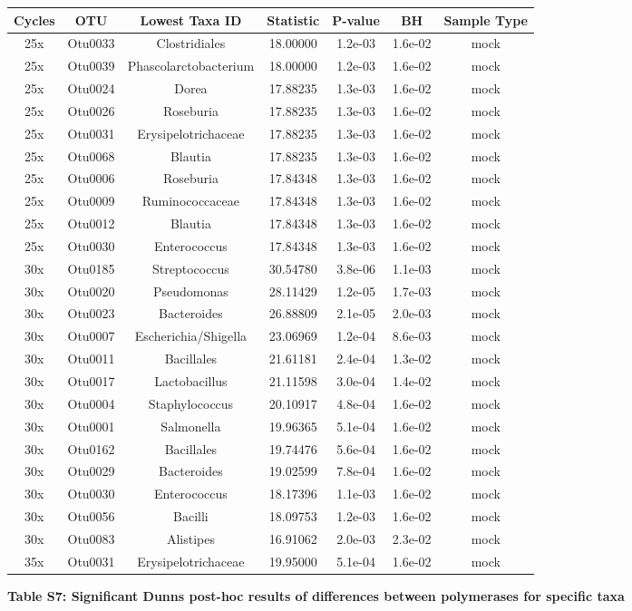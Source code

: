 \documentclass[11pt,]{article}
\begin{document}
\begin{longtable}[]{@{}ccccccc@{}}
\toprule
Cycles & OTU & Lowest Taxa ID & Statistic & P-value & BH & Sample
Type\tabularnewline
\midrule
\endhead
25x & Otu0033 & Clostridiales & 18.00000 & 1.2e-03 & 1.6e-02 &
mock\tabularnewline
25x & Otu0039 & Phascolarctobacterium & 18.00000 & 1.2e-03 & 1.6e-02 &
mock\tabularnewline
25x & Otu0024 & Dorea & 17.88235 & 1.3e-03 & 1.6e-02 &
mock\tabularnewline
25x & Otu0026 & Roseburia & 17.88235 & 1.3e-03 & 1.6e-02 &
mock\tabularnewline
25x & Otu0031 & Erysipelotrichaceae & 17.88235 & 1.3e-03 & 1.6e-02 &
mock\tabularnewline
25x & Otu0068 & Blautia & 17.88235 & 1.3e-03 & 1.6e-02 &
mock\tabularnewline
25x & Otu0006 & Roseburia & 17.84348 & 1.3e-03 & 1.6e-02 &
mock\tabularnewline
25x & Otu0009 & Ruminococcaceae & 17.84348 & 1.3e-03 & 1.6e-02 &
mock\tabularnewline
25x & Otu0012 & Blautia & 17.84348 & 1.3e-03 & 1.6e-02 &
mock\tabularnewline
25x & Otu0030 & Enterococcus & 17.84348 & 1.3e-03 & 1.6e-02 &
mock\tabularnewline
30x & Otu0185 & Streptococcus & 30.54780 & 3.8e-06 & 1.1e-03 &
mock\tabularnewline
30x & Otu0020 & Pseudomonas & 28.11429 & 1.2e-05 & 1.7e-03 &
mock\tabularnewline
30x & Otu0023 & Bacteroides & 26.88809 & 2.1e-05 & 2.0e-03 &
mock\tabularnewline
30x & Otu0007 & Escherichia/Shigella & 23.06969 & 1.2e-04 & 8.6e-03 &
mock\tabularnewline
30x & Otu0011 & Bacillales & 21.61181 & 2.4e-04 & 1.3e-02 &
mock\tabularnewline
30x & Otu0017 & Lactobacillus & 21.11598 & 3.0e-04 & 1.4e-02 &
mock\tabularnewline
30x & Otu0004 & Staphylococcus & 20.10917 & 4.8e-04 & 1.6e-02 &
mock\tabularnewline
30x & Otu0001 & Salmonella & 19.96365 & 5.1e-04 & 1.6e-02 &
mock\tabularnewline
30x & Otu0162 & Bacillales & 19.74476 & 5.6e-04 & 1.6e-02 &
mock\tabularnewline
30x & Otu0029 & Bacteroides & 19.02599 & 7.8e-04 & 1.6e-02 &
mock\tabularnewline
30x & Otu0030 & Enterococcus & 18.17396 & 1.1e-03 & 1.6e-02 &
mock\tabularnewline
30x & Otu0056 & Bacilli & 18.09753 & 1.2e-03 & 1.6e-02 &
mock\tabularnewline
30x & Otu0083 & Alistipes & 16.91062 & 2.0e-03 & 2.3e-02 &
mock\tabularnewline
35x & Otu0031 & Erysipelotrichaceae & 19.95000 & 5.1e-04 & 1.6e-02 &
mock\tabularnewline
\bottomrule
\end{longtable}

\newpage

\textbf{Table S7: Significant Dunns post-hoc results of differences
between polymerases for specific taxa}

\footnotesize
\end{document}
